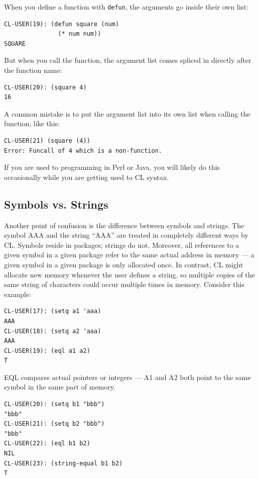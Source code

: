 When you define a function with \texttt{defun}, the arguments go inside their own list:

\begin{verbatim}
CL-USER(19): (defun square (num)
               (* num num))
SQUARE
\end{verbatim}

But when you call the function, the argument list comes spliced in directly after the function
name:

\begin{verbatim}
CL-USER(20): (square 4)
16
\end{verbatim}

A common mistake is to put the argument list into its own list when calling the function,
like this:

\begin{verbatim}
CL-USER(21) (square (4))
Error: Funcall of 4 which is a non-function.
\end{verbatim}

If you are used to programming in Perl or Java, you will likely do this occasionally while
you are getting used to CL syntax.

\subsection{Symbols vs. Strings}

Another point of confusion is the difference between symbols and strings. The symbol AAA
and the string ``AAA'' are treated in completely different ways by CL. Symbols reside in
packages; strings do not. Moreover, all references to a given symbol in a given package
refer to the same actual address in memory --- a given symbol in a given package is only
allocated once. In contrast, CL might allocate new memory whenever the user defines a
string, so multiple copies of the same string of characters could occur multiple times in
memory. Consider this example:

\begin{verbatim}
CL-USER(17): (setq a1 'aaa)
AAA
CL-USER(18): (setq a2 'aaa)
AAA
CL-USER(19): (eql a1 a2)
T
\end{verbatim}

EQL compares actual pointers or integers --- A1 and A2 both point to the same symbol
in the same part of memory.

\begin{verbatim}
CL-USER(20): (setq b1 "bbb")
"bbb"
CL-USER(21): (setq b2 "bbb")
"bbb"
CL-USER(22): (eql b1 b2)
NIL
CL-USER(23): (string-equal b1 b2)
T
\end{verbatim}

